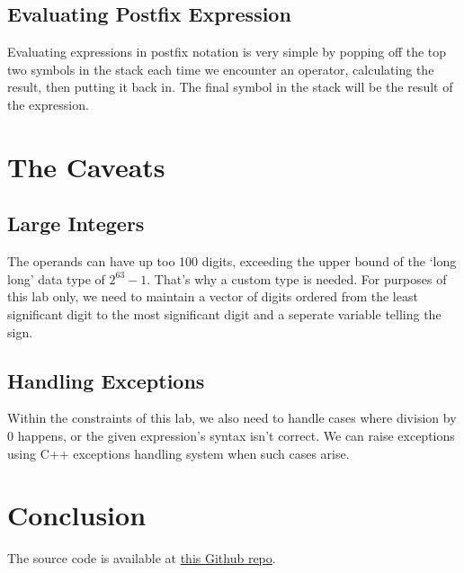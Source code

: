 \documentclass{article}
\begin{document}
\subsection*{Evaluating Postfix Expression}

Evaluating expressions in postfix notation is very simple by popping off the top two symbols in the stack each time we encounter an operator, calculating the result, then putting it back in. The final symbol in the stack will be the result of the expression.

\section{The Caveats}
\label{caveats}

\subsection*{Large Integers}
\label{large_integers}

The operands can have up too 100 digits, exceeding the upper bound of the `long long' data type of $2^{63} - 1$. That's why a custom type is needed. For purposes of this lab only, we need to maintain a vector of digits ordered from the least significant digit to the most significant digit and a seperate variable telling the sign.

\subsection*{Handling Exceptions}
\label{handling_exceptions}

Within the constraints of this lab, we also need to handle cases where division by 0 happens, or the given expression's syntax isn't correct. We can raise exceptions using C++ exceptions handling system when such cases arise.

\section{Conclusion}
\label{conclusion}

The source code is available at \href{https://github.com/xtrkoi/throwaway-rep}{this Github repo}.
\end{document}
